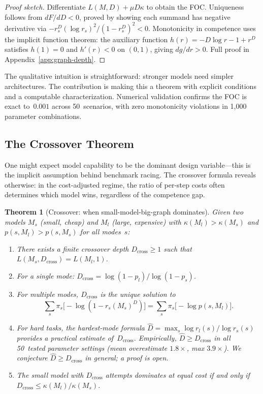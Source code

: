 \documentclass[twoside,11pt]{article}
\newtheorem{theorem}{Theorem}
\newcommand{\Dcross}{D_{\mathrm{cross}}}
\newcommand{\appref}[1]{Appendix~\ref{#1}}
\begin{document}
\begin{proof}[Proof sketch]
Differentiate $L(M,D) + \mu D \kappa$ to obtain the FOC.
Uniqueness follows from $dF/dD < 0$, proved by showing each summand has negative derivative via $-r_s^D (\log r_s)^2 / (1-r_s^D)^2 < 0$.
Monotonicity in competence uses the implicit function theorem: the auxiliary function $h(r) = -D\log r - 1 + r^D$ satisfies $h(1) = 0$ and $h'(r) < 0$ on $(0,1)$, giving $dg/dr > 0$.
Full proof in \appref{app:graph-depth}.
\end{proof}

The qualitative intuition is straightforward: stronger models need simpler architectures.
The contribution is making this a theorem with explicit conditions and a computable characterization.
Numerical validation confirms the FOC is exact to~$0.001$ across 50~scenarios, with zero monotonicity violations in 1{,}000 parameter combinations.

\subsection{The Crossover Theorem}
\label{sec:crossover}

One might expect model capability to be the dominant design variable---this is the implicit assumption behind benchmark racing.
The crossover formula reveals otherwise: in the cost-adjusted regime, the ratio of per-step costs often determines which model wins, regardless of the competence gap.

\begin{theorem}[Crossover: when small-model-big-graph dominates]
\label{thm:crossover}
Given two models $M_s$ (small, cheap) and $M_l$ (large, expensive) with $\kappa(M_l) > \kappa(M_s)$ and $p(s, M_l) > p(s, M_s)$ for all modes~$s$:
\begin{enumerate}[label=(\alph*)]
  \item There exists a finite crossover depth $\Dcross \ge 1$ such that $L(M_s, \Dcross) = L(M_l, 1)$.
  \item For a single mode: $\Dcross = \log(1 - p_l) / \log(1 - p_s)$.
  \item For multiple modes, $\Dcross$ is the unique solution to
  \[
    \sum_s \pi_s\bigl[-\log(1-r_s(M_s)^D)\bigr]
    =
    \sum_s \pi_s\bigl[-\log p(s,M_l)\bigr].
  \]
  \item For hard tasks, the hardest-mode formula $\hat{D} = \max_s \log r_l(s) / \log r_s(s)$ provides a practical estimate of~$\Dcross$. Empirically, $\hat{D} \ge \Dcross$ in all 50~tested parameter settings (mean overestimate $1.8\times$, max $3.9\times$). We conjecture $\hat{D} \ge \Dcross$ in general; a proof is open.
  \item The small model with $\Dcross$ attempts dominates at equal cost if and only if $\Dcross \le \kappa(M_l) / \kappa(M_s)$.
\end{enumerate}
\end{theorem}
\end{document}
